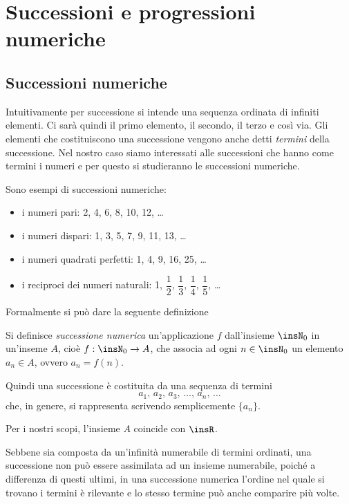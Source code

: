 \chapter{Successioni e progressioni numeriche}

\section{Successioni numeriche}

Intuitivamente per successione si intende una sequenza ordinata di infiniti elementi. Ci sarà quindi il primo elemento, il secondo, il terzo e così via.
Gli elementi che costituiscono una successione vengono anche detti \emph{termini} della successione.
Nel nostro caso siamo interessati alle successioni che hanno come termini i numeri e per questo si studieranno le successioni numeriche.

Sono esempi di successioni numeriche:

\begin{itemize}
\item i numeri pari: 2, 4, 6, 8, 10, 12, \ldots
\item i numeri dispari: 1, 3, 5, 7, 9, 11, 13, \ldots
\item i numeri quadrati perfetti: 1, 4, 9, 16, 25, \ldots
\item i reciproci dei numeri naturali: 1, $\dfrac{1}{2}$, $\dfrac{1}{3}$, $\dfrac{1}{4}$, $\dfrac{1}{5}$, \ldots
\end{itemize}

Formalmente si può dare la seguente definizione

\begin{definizione}
Si definisce \emph{successione numerica} un'applicazione $f$ dall'insieme $\insN_0$ in un'inseme $A$, cioè $f:\insN_0\to A$, che associa ad ogni $n\in\insN_0$ un elemento $a_n\in A$, ovvero $a_n = f(n)$.
\end{definizione}

Quindi una successione è costituita da una sequenza di termini
\[a_1\text{, }a_2\text{, }a_3\text{, }\ldots\text{, }a_n\text{, }\ldots\]
che, in genere, si rappresenta scrivendo semplicemente $\{a_n\}$.

Per i nostri scopi, l'insieme $A$ coincide con $\insR$.

Sebbene sia composta da un'infinità numerabile di termini ordinati, una successione non può essere assimilata ad un insieme numerabile, poiché a differenza di questi ultimi, in una successione numerica l'ordine nel quale si trovano i termini è rilevante e lo stesso termine può anche comparire più volte.

